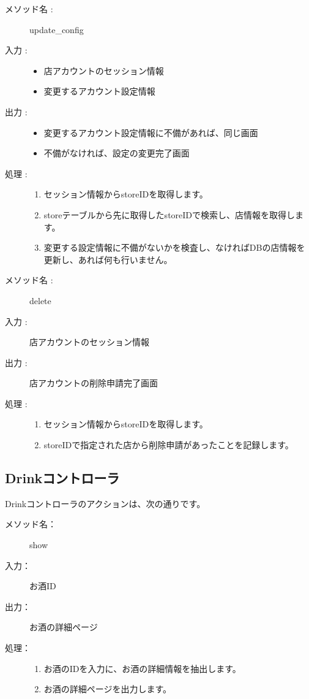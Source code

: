 \documentclass[a4j,titlepage]{jarticle}
\begin{document}
\clearpage

\begin{description}
  \item [メソッド名 :] update\_config
  \item [入力 :]\mbox{}
  \begin{itemize}
    \item 店アカウントのセッション情報
    \item 変更するアカウント設定情報
  \end{itemize}
  \item [出力 :]\mbox{}
  \begin{itemize}
    \item 変更するアカウント設定情報に不備があれば、同じ画面
    \item 不備がなければ、設定の変更完了画面
  \end{itemize}
  \item [処理 :]\mbox{}
  \begin{enumerate}
    \item セッション情報からstoreIDを取得します。
    \item storeテーブルから先に取得したstoreIDで検索し、店情報を取得します。
    \item 変更する設定情報に不備がないかを検査し、なければDBの店情報を更新し、あれば何も行いません。
  \end{enumerate}
\end{description}

\begin{description}
  \item [メソッド名 :] delete
  \item [入力 :] 店アカウントのセッション情報
  \item [出力 :] 店アカウントの削除申請完了画面
  \item [処理 :]\mbox{}
  \begin{enumerate}
    \item セッション情報からstoreIDを取得します。
    \item storeIDで指定された店から削除申請があったことを記録します。
  \end{enumerate}
\end{description}

\subsection{Drinkコントローラ}
Drinkコントローラのアクションは、次の通りです。

\begin{description}
\item [メソッド名：] show
\item [入力：] お酒ID
\item [出力：] お酒の詳細ページ
\item [処理：]\mbox{}
  \begin{enumerate}
  \item お酒のIDを入力に、お酒の詳細情報を抽出します。
  \item お酒の詳細ページを出力します。
  \end{enumerate}
\end{description}
\end{document}

